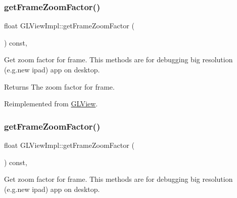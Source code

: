 \mbox{\label{classGLViewImpl_a16f58cd2c122ecf8f3feb7bca6f4309d}} 
\subsubsection{\texorpdfstring{get\+Frame\+Zoom\+Factor()}{getFrameZoomFactor()}\hspace{0.1cm}{\footnotesize\ttfamily [1/2]}}
{\footnotesize\ttfamily float G\+L\+View\+Impl\+::get\+Frame\+Zoom\+Factor (\begin{DoxyParamCaption}{ }\end{DoxyParamCaption}) const\hspace{0.3cm}{\ttfamily [override]}, {\ttfamily [virtual]}}

Get zoom factor for frame. This methods are for debugging big resolution (e.\+g.\+new ipad) app on desktop.

\begin{DoxyReturn}{Returns}
The zoom factor for frame. 
\end{DoxyReturn}


Reimplemented from \hyperlink{classGLView_ab804d7568f68b8d91cf420d1c0057f38}{G\+L\+View}.

\mbox{\label{classGLViewImpl_a16f58cd2c122ecf8f3feb7bca6f4309d}} 
\subsubsection{\texorpdfstring{get\+Frame\+Zoom\+Factor()}{getFrameZoomFactor()}\hspace{0.1cm}{\footnotesize\ttfamily [2/2]}}
{\footnotesize\ttfamily float G\+L\+View\+Impl\+::get\+Frame\+Zoom\+Factor (\begin{DoxyParamCaption}{ }\end{DoxyParamCaption}) const\hspace{0.3cm}{\ttfamily [override]}, {\ttfamily [virtual]}}

Get zoom factor for frame. This methods are for debugging big resolution (e.\+g.\+new ipad) app on desktop.

